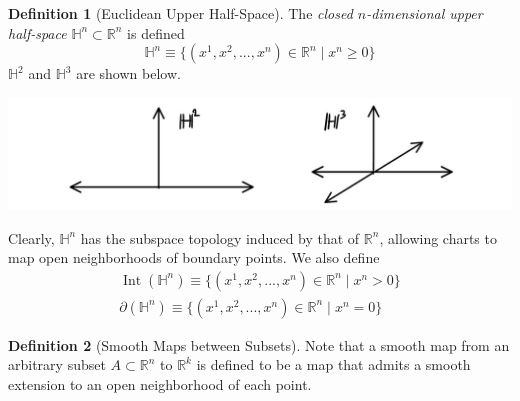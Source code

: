 \documentclass{article}
\DeclareMathOperator{\Int}{Int}
\theoremstyle{remark}
\theoremstyle{definition}
\newtheorem{definition}{Definition}[section]
\begin{document}
\begin{definition}[Euclidean Upper Half-Space]
The \textit{closed $n$-dimensional upper half-space} $\mathbb{H}^n \subset \mathbb{R}^n$ is defined
\[\mathbb{H}^n \equiv \big\{ (x^1, x^2, ..., x^n) \in \mathbb{R}^n \;|\; x^n \geq 0\big\}\]
$\mathbb{H}^2$ and $\mathbb{H}^3$ are shown below. 
\begin{center}
    \includegraphics[scale=0.25]{img/Half_Euclidean_Space.PNG}
\end{center}
Clearly, $\mathbb{H}^n$ has the subspace topology induced by that of $\mathbb{R}^n$, allowing charts to map open neighborhoods of boundary points. We also define
\begin{align*}
    \Int(\mathbb{H}^n) \equiv \big\{ (x^1, x^2, ..., x^n) \in \mathbb{R}^n \;|\; x^n > 0\big\} \\
    \partial(\mathbb{H}^n) \equiv \big\{ (x^1, x^2, ..., x^n) \in \mathbb{R}^n \;|\; x^n = 0\big\}
\end{align*}
\end{definition}

\begin{definition}[Smooth Maps between Subsets]
Note that a smooth map from an arbitrary subset $A \subset \mathbb{R}^n$ to $\mathbb{R}^k$ is defined to be a map that admits a smooth extension to an open neighborhood of each point. 
\begin{center}
\end{center}
\end{definition}
\end{document}
